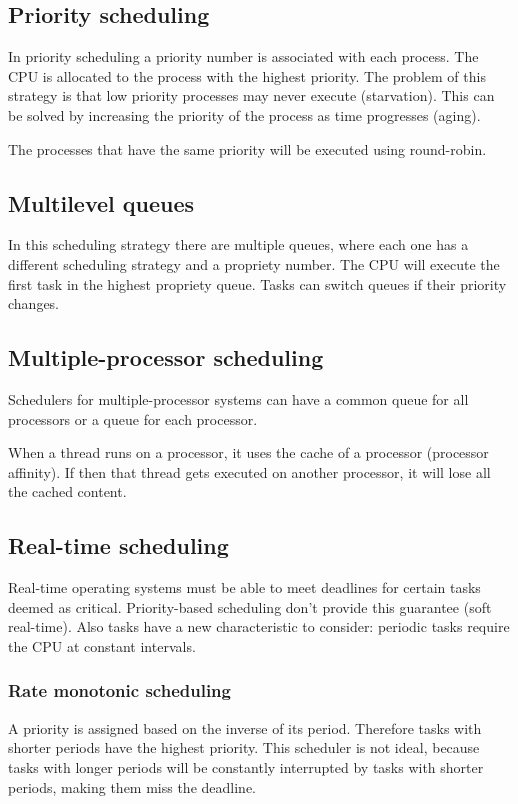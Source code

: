 \subsection{Priority scheduling}
In priority scheduling a priority number is associated with each process. The CPU is allocated to the process with the highest priority. The problem of this strategy is that low priority processes may never execute (starvation). This can be solved by increasing the priority of the process as time progresses (aging).

The processes that have the same priority will be executed using round-robin.

\subsection{Multilevel queues}
In this scheduling strategy there are multiple queues, where each one has a different scheduling strategy and a propriety number. The CPU will execute the first task in the highest propriety queue. Tasks can switch queues if their priority changes.


\subsection{Multiple-processor scheduling}
Schedulers for multiple-processor systems can have a common queue for all processors or a queue for each processor.

When a thread runs on a processor, it uses the cache of a processor (processor affinity). If then that thread gets executed on another processor, it will lose all the cached content.

\subsection{Real-time scheduling}
Real-time operating systems must be able to meet deadlines for certain tasks deemed as critical. Priority-based scheduling don't provide this guarantee (soft real-time). Also tasks have a new characteristic to consider:  periodic tasks require the CPU at constant intervals.


\subsubsection{Rate monotonic scheduling}
A priority is assigned based on the inverse of its period. Therefore tasks with shorter periods have the highest priority. This scheduler is not ideal, because tasks with longer periods will be constantly interrupted by tasks with shorter periods, making them miss the deadline.

